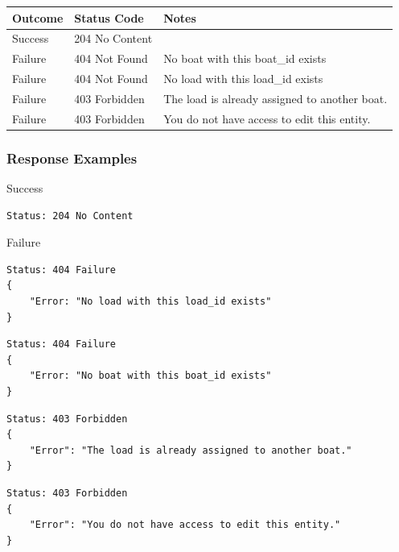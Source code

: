 \documentclass[letterpaper,11pt,titlepage,draftclsnofoot,onecolumn,compsoc,utf8,latin1]{IEEEtran}
\begin{document}
\begin{singlespace}
\begin{center}
\begin{tabular}{ |p{}|p{}|p{}| } 
 \hline
 \textbf{Outcome} & \textbf{Status Code} & \textbf{Notes}  \\  \hline
 Success & 204 No Content &  \\ \hline
 Failure & 404 Not Found & No boat with this boat\_id exists \\ \hline
 Failure & 404 Not Found & No load with this load\_id exists \\ \hline 
 Failure & 403 Forbidden & The load is already assigned to another boat. \\ \hline
 Failure & 403 Forbidden & You do not have access to edit this entity. \\
 \hline
\end{tabular}
\end{center}

\subsubsection{Response Examples}

\noindent \Large{Success}

\begin{lstlisting}[]
Status: 204 No Content
\end{lstlisting}

\noindent \Large{Failure}

\begin{lstlisting}[]
Status: 404 Failure
{
    "Error: "No load with this load_id exists"
}
\end{lstlisting}

\begin{lstlisting}[]
Status: 404 Failure
{
    "Error: "No boat with this boat_id exists"
}
\end{lstlisting}

\begin{lstlisting}[]
Status: 403 Forbidden
{
    "Error": "The load is already assigned to another boat."
}
\end{lstlisting}

\begin{lstlisting}[]
Status: 403 Forbidden
{
    "Error": "You do not have access to edit this entity."
}

\end{lstlisting}

\newpage

\normalsize


\end{singlespace}
\end{document}
